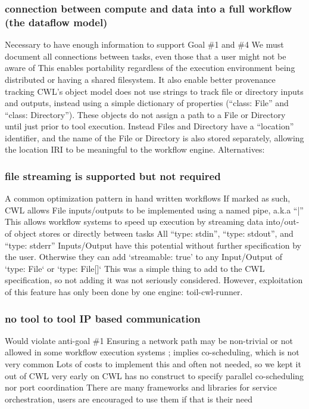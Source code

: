 \subsubsection{connection between compute and data into a full workflow (the dataflow model)}
Necessary to have enough information to support Goal \#1 and \#4
We must document all connections between tasks, even those that a user might not be aware of
This enables portability regardless of the execution environment being  distributed or having a shared filesystem. It also enable better provenance tracking
CWL’s object model does not use strings to track file or directory inputs and outputs, instead using a simple dictionary of properties (“class: File” and “class: Directory”). These objects do not assign a path to a File or Directory until just prior to tool execution. Instead Files and Directory have a “location” identifier, and the name of the File or Directory is also stored separately, allowing the location IRI to be meaningful to the workflow engine.
Alternatives:

\subsubsection{file streaming is supported but not required}
A common optimization pattern in hand written workflows
If marked as such, CWL allows File inputs/outputs to be implemented using a named pipe, a.k.a “|”
This allows workflow systems to speed up execution by streaming data into/out-of object stores or directly between tasks
All “type: stdin”, “type: stdout”, and “type: stderr” Inputs/Output have this potential without further specification by the user. Otherwise they can add `streamable: true’ to any Input/Output of `type: File` or `type: File[]`
This was a simple thing to add to the CWL specification, so not adding it was not seriously considered. However, exploitation of this feature has only been done by one engine: toil-cwl-runner.

\subsubsection{no tool to tool IP based communication}
Would violate anti-goal \#1
Ensuring a network path may be non-trivial or not allowed in some workflow execution systems ; implies co-scheduling, which is not very common
Lots of costs to implement this and often not needed, so we kept it out of CWL very early on
CWL has no construct to specify parallel co-scheduling nor port coordination
There are many frameworks and libraries for service orchestration, users are encouraged to use them if that is their need


